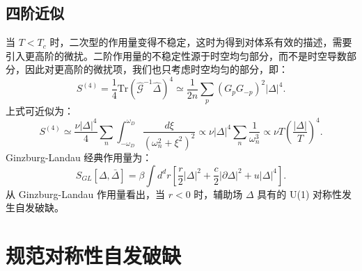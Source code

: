 \documentclass[10pt,UTF8]{ctexart}
\begin{document}
\subsection*{四阶近似}
\noindent 当 $T < T_c$ 时，二次型的作用量变得不稳定，这时为得到对体系有效的描述，需要引入更高阶的微扰。二阶作用量的不稳定性源于时空均匀部分，而不是时空导数部分，因此对更高阶的微扰项，我们也只考虑时空均匀的部分，即：
\begin{equation}
	S^{(4)} = \frac{1}{4} \mathrm{Tr} (\hat{\mathcal G}^{-1} \hat\Delta)^{4}
	\simeq \frac{1}{2n}\sum_p (G_p G_{-p})^2 |\Delta|^{4}.
\end{equation}
上式可近似为：
\begin{equation}
	S^{(4)} \simeq \frac{\nu |\Delta|^4}{4} \sum_n \int_{-\omega_D}^{\omega_D} \frac{d\xi}{(\omega_n^2+\xi^2)^{2}}
	\propto \nu |\Delta|^4 \sum_n \frac{1}{\omega_n^3}
	\propto \nu T \left(\frac{|\Delta|}{T} \right)^4.
\end{equation}
Ginzburg-Landau 经典作用量为：
\begin{equation}
	S_{GL}[\Delta,\bar\Delta]=\beta\int d^d r\left[ \frac{r}{2}|\Delta|^2+\frac{c}{2}|\partial \Delta|^2+u|\Delta|^4 \right].
\end{equation}
从 Ginzburg-Landau 作用量看出，当 $r < 0$ 时，辅助场 $\Delta$ 具有的 U(1) 对称性发生自发破缺。


\section*{规范对称性自发破缺}
\end{document}
